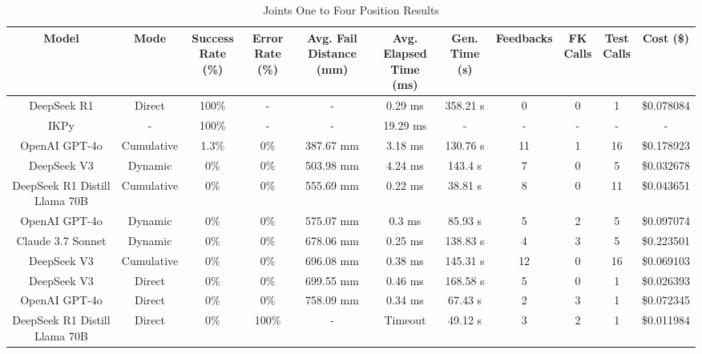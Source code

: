 \begin{landscape}
\begin{table}[H]
\tiny
\renewcommand{\arraystretch}{1.2}
\caption{Joints One to Four Position Results}
\begin{center}
\begin{tabular}{|c|c|c|c|c|c|c|c|c|c|c|}
    \hline
    \textbf{Model} & 
    \textbf{Mode} & 
    \makecell{\textbf{Success}\\\textbf{Rate (\%)}} &
    \makecell{\textbf{Error}\\\textbf{Rate (\%)}} &
    \makecell{\textbf{Avg. Fail}\\\textbf{Distance (mm)}} &
    \makecell{\textbf{Avg. Elapsed}\\\textbf{Time (ms)}} &
    \makecell{\textbf{Gen.}\\\textbf{Time (s)}} &
    \textbf{Feedbacks} &
    \makecell{\textbf{FK}\\\textbf{Calls}} &
    \makecell{\textbf{Test}\\\textbf{Calls}} &
    \textbf{Cost (\$)} \\
    \hline
    DeepSeek R1 & Direct & 100\% & - & - & 0.29 ms & 358.21 s & 0 & 0 & 1 & \$0.078084 \\
    \hline
    IKPy & - & 100\% & - & - & 19.29 ms & - & - & - & - & - \\
    \hline
    OpenAI GPT-4o & Cumulative & 1.3\% & 0\% & 387.67 mm & 3.18 ms & 130.76 s & 11 & 1 & 16 & \$0.178923 \\
    \hline
    DeepSeek V3 & Dynamic & 0\% & 0\% & 503.98 mm & 4.24 ms & 143.4 s & 7 & 0 & 5 & \$0.032678 \\
    \hline
    DeepSeek R1 Distill Llama 70B & Cumulative & 0\% & 0\% & 555.69 mm & 0.22 ms & 38.81 s & 8 & 0 & 11 & \$0.043651 \\
    \hline
    OpenAI GPT-4o & Dynamic & 0\% & 0\% & 575.07 mm & 0.3 ms & 85.93 s & 5 & 2 & 5 & \$0.097074 \\
    \hline
    Claude 3.7 Sonnet & Dynamic & 0\% & 0\% & 678.06 mm & 0.25 ms & 138.83 s & 4 & 3 & 5 & \$0.223501 \\
    \hline
    DeepSeek V3 & Cumulative & 0\% & 0\% & 696.08 mm & 0.38 ms & 145.31 s & 12 & 0 & 16 & \$0.069103 \\
    \hline
    DeepSeek V3 & Direct & 0\% & 0\% & 699.55 mm & 0.46 ms & 168.58 s & 5 & 0 & 1 & \$0.026393 \\
    \hline
    OpenAI GPT-4o & Direct & 0\% & 0\% & 758.09 mm & 0.34 ms & 67.43 s & 2 & 3 & 1 & \$0.072345 \\
    \hline
    DeepSeek R1 Distill Llama 70B & Direct & 0\% & 100\% & - & Timeout & 49.12 s & 3 & 2 & 1 & \$0.011984 \\
    \hline
\end{tabular}
\label{Results-Position-1-4}
\end{center}
\end{table}


\end{landscape}
